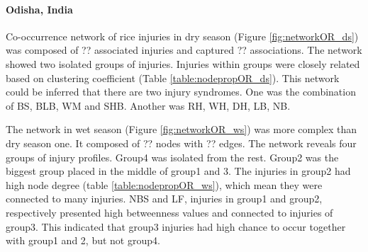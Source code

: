 \paragraph{Odisha, India}

Co-occurrence network of rice injuries in dry season (Figure \ref{fig:networkOR_ds}) was composed of ?? associated injuries and captured ?? associations. The network showed two isolated groups of injuries. Injuries within groups were closely related based on clustering coefficient (Table \ref{table:nodepropOR_ds}). This network could be inferred that there are two injury syndromes. One was the combination of BS, BLB, WM and SHB. Another was RH, WH, DH, LB, NB.

The network in wet season (Figure \ref{fig:networkOR_ws}) was more complex than dry season one. It composed of ?? nodes with ?? edges. The network reveals four groups of injury profiles. Group4 was isolated from the rest. Group2 was the biggest group placed in the middle of group1 and 3. The injuries in group2 had high node degree (table \ref{table:nodepropOR_ws}), which mean they were connected to many injuries. NBS and LF, injuries in group1 and group2, respectively presented high betweenness values and connected to injuries of group3. This indicated that group3 injuries had high chance to occur together with group1 and 2, but not group4. 

